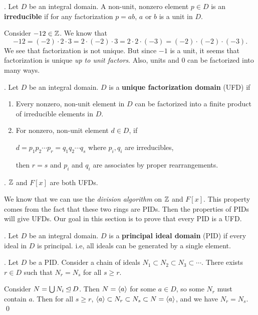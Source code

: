 \pagebreak

.  Let \(D\) be an integral domain. A non-unit, nonzero element \(p \in D\) is an \textbf{irreducible} if for any factorization \(p = ab\), \(a\) or \(b\) is a unit in \(D\).

Consider \(-12 \in \mathbb{Z}\). We know that
\[
    -12 = (-2)\cdot 2 \cdot 3 = 2 \cdot (-2) \cdot 3 = 2 \cdot 2 \cdot (-3) = (-2) \cdot (-2) \cdot (-3).
\]
We see that factorization is not unique. But since \(-1\) is a unit, it seems that factorization is unique \textit{up to unit factors}. Also, units and \(0\) can be factorized into many ways.

.  Let \(D\) be an integral domain. \(D\) is a \textbf{unique factorization domain} (UFD) if
\begin{enumerate}
    \item Every nonzero, non-unit element in \(D\) can be factorized into a finite product of irreducible elements in \(D\).
    \item For nonzero, non-unit element \(d \in D\), if
    \begin{center}
        \(d = p_1p_2 \cdots p_r = q_1q_2 \cdots q_s\) where \(p_i, q_i\) are irreducibles,
    \end{center}
    then \(r = s\) and \(p_i\) and \(q_i\) are associates by proper rearrangements.
\end{enumerate}

\ex. \(\mathbb{Z}\) and \(F[x]\) are both UFDs.

We know that we can use the \textit{division algorithm} on \(\mathbb{Z}\) and \(F[x]\). This property comes from the fact that these two rings are PIDs. Then the properties of PIDs will give UFDs. Our goal in this section is to prove that every PID is a UFD.

.  Let \(D\) be an integral domain. \(D\) is a \textbf{principal ideal domain} (PID) if every ideal in \(D\) is principal. i.e, all ideals can be generated by a single element.

\lemma.  Let \(D\) be a PID. Consider a chain of ideals \(N_1 \subset N_2 \subset N_3 \subset \cdots\).
There exists \(r \in D\) such that \(N_r = N_s\) for all \(s \geq r\).

\pf Consider \(N = \bigcup N_i \unlhd D\). Then \(N = \left\langle a \right\rangle\) for some \(a \in D\), so some \(N_r\) must contain \(a\). Then for all \(s \geq r\), \(\left\langle a \right\rangle \subset N_r \subset N_s \subset N = \left\langle a \right\rangle\), and we have \(N_r = N_s\). \qed

